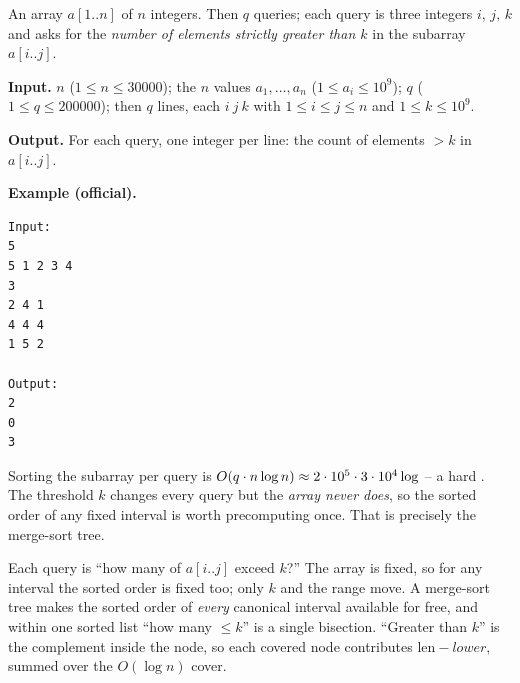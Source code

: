 \begin{problemstatement}
An array \(a[1..n]\) of \(n\) integers.  Then \(q\) queries; each query is three integers \(i,\,j,\,k\) and asks for the \emph{number of elements strictly greater than \(k\)} in the subarray \(a[i..j]\).

\textbf{Input.} \(n\) (\(1\le n\le 30000\)); the \(n\) values \(a_1,\dots,a_n\) (\(1\le a_i\le 10^9\)); \(q\) (\(1\le q\le 200000\)); then \(q\) lines, each \(i\ j\ k\) with \(1\le i\le j\le n\) and \(1\le k\le 10^9\).

\textbf{Output.} For each query, one integer per line: the count of elements \(> k\) in \(a[i..j]\).

\textbf{Example (official).}
\begin{verbatim}
Input:
5
5 1 2 3 4
3
2 4 1
4 4 4
1 5 2

Output:
2
0
3
\end{verbatim}
\end{problemstatement}

\begin{attemptgate}
Sorting the subarray per query is \(O(q\cdot n\log n)\approx 2\cdot10^5\cdot 3\cdot10^4\log\) -- a hard \tle.  The threshold \(k\) changes every query but the \emph{array never does}, so the sorted order of any fixed interval is worth precomputing once.  That is precisely the merge-sort tree.
\end{attemptgate}

Each query is ``how many of \(a[i..j]\) exceed \(k\)?''  The array is fixed, so for any interval the sorted order is fixed too; only \(k\) and the range move.  A merge-sort tree makes the sorted order of \emph{every} canonical interval available for free, and within one sorted list ``how many \(\le k\)'' is a single bisection.  ``Greater than \(k\)'' is the complement inside the node, so each covered node contributes \(\text{len}-\mathit{lower}\), summed over the \(O(\log n)\) cover.

